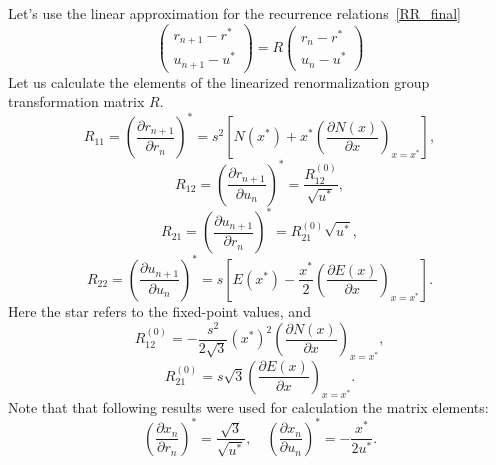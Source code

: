 Let's use the linear approximation for the recurrence relations~\ref{RR_final}
\begin{equation}
	\label{eq:linear_rr}
	\left(
		\begin{array}{c}
			r_{n+1} - r^* \\
			u_{n+1} - u^*
		\end{array}
	\right)
	= R
	\left(
		\begin{array}{c}
			r_{n} - r^* \\
			u_{n} - u^*
		\end{array}
	\right)
\end{equation}
Let us calculate the elements of the linearized renormalization group transformation matrix $R$.
\begin{equation*}
	R_{11} = \left(\frac{\partial r_{n+1}}{\partial r_n}\right)^* = s^2 \left[N(x^*) + x^* \left(\frac{\partial N(x)}{\partial x} \right)_{x=x^*} \right],
\end{equation*}
\begin{equation*}
	R_{12} = \left(\frac{\partial r_{n+1}}{\partial u_n}\right)^* = \frac{R_{12}^{(0)}}{\sqrt{u^*}},
\end{equation*}
\begin{equation*}
	R_{21} = \left(\frac{\partial u_{n+1}}{\partial r_n}\right)^* = R_{21}^{(0)} \sqrt{u^*},
\end{equation*}
\begin{equation*}
	R_{22} = \left(\frac{\partial u_{n+1}}{\partial u_n}\right)^* = s \left[E(x^*) - \frac{x^*}{2} \left(\frac{\partial E(x)}{\partial x}\right)_{x=x^*}\right].
\end{equation*}
Here the star refers to the fixed-point values, and
\begin{equation*}
	R_{12}^{(0)} = -\frac{s^2}{2\sqrt{3}} (x^*)^2 \left(\frac{\partial N(x)}{\partial x} \right)_{x=x^*},
\end{equation*}
\begin{equation*}
	R_{21}^{(0)} = s\sqrt{3} \left(\frac{\partial E(x)}{\partial x}\right)_{x=x^*}.
\end{equation*}
Note that that following results were used for calculation the matrix elements:
\begin{equation*}
	\left(\frac{\partial x_n}{\partial r_n}\right)^* = \frac{\sqrt{3}}{\sqrt{u^*}}, 
	\quad
	\left(\frac{\partial x_n}{\partial u_n}\right)^* = - \frac{x^*}{2u^*}.
\end{equation*}

